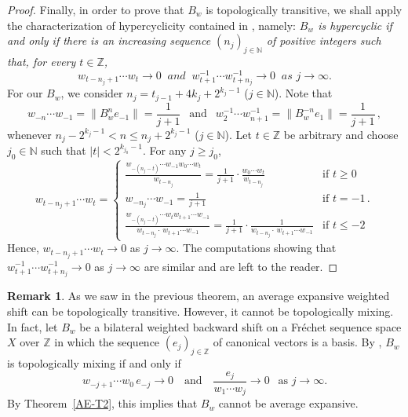\documentclass[12pt]{amsart}
\theoremstyle{theorem}
\theoremstyle{definition}
\newtheorem{remark}[theorem]{Remark}
\theoremstyle{remark} \theoremstyle{question} \theoremstyle{example}
\newcommand{\N}{\mathbb{N}}   %
\newcommand{\Z}{\mathbb{Z}}   %
\begin{document}
\begin{proof}
Finally, in order to prove that $B_w$ is topologically transitive, we shall apply the characterization of hypercyclicity contained
in \cite[Example~4.15]{KGroAPer11}, namely: {\it $B_w$ is hypercyclic if and only if there is an increasing sequence $(n_j)_{j \in \N}$
of positive integers such that, for every $t \in \Z$,}
\[
w_{t - n_j + 1} \cdots w_t \to 0 \ \textit{ and } \ w_{t+1}^{-1} \cdots w_{t+n_j}^{-1} \to 0 \ \textit{ as } j \to \infty.
\]
For our $B_w$, we consider $n_j = t_{j-1} + 4k_j + 2^{k_j - 1}$ ($j \in \N$). Note that
\[
w_{-n} \cdots w_{-1} = \|B_w^n e_{-1}\| = \frac{1}{j+1} \ \ \text{ and } \ \ w_2^{-1} \cdots w_{n+1}^{-1} = \|B_w^{-n} e_1\| = \frac{1}{j+1}\,,
\]
whenever $n_j - 2^{k_j - 1} < n \leq n_j + 2^{k_j - 1}$ ($j \in \N$).
Let $t \in \Z$ be arbitrary and choose $j_0 \in \N$ such that $|t| < 2^{k_{j_0} - 1}$.
For any $j \geq j_0$,
\[
w_{t - n_j + 1} \cdots w_t = \left\{\begin{array}{cl}
  \frac{w_{-(n_j - t)} \cdots w_{-1} w_0 \cdots w_t}{w_{t - n_j}} = \frac{1}{j+1} \cdot \frac{w_0 \cdots w_t}{w_{t - n_j}} & \text{if } t \geq 0\\
  w_{-n_j} \cdots w_{-1} = \frac{1}{j+1} & \text{if } t = -1\,.\\
  \frac{w_{-(n_j - t)} \cdots w_{t} w_{t+1} \cdots w_{-1}}{w_{t - n_j} \cdot\, w_{t+1} \cdots w_{-1}} 
    = \frac{1}{j+1} \cdot \frac{1}{w_{t - n_j} \cdot\, w_{t+1} \cdots w_{-1}}& \text{if } t \leq -2
\end{array}\right.
\]
Hence, $w_{t - n_j + 1} \cdots w_t \to 0$ as $j \to \infty$.
The computations showing that $w_{t+1}^{-1} \cdots w_{t+n_j}^{-1} \to 0$ as $j \to \infty$ are similar and are left to the reader.
\end{proof}

\begin{remark}
As we saw in the previous theorem, an average expansive weighted shift can be topologically transitive.
However, it cannot be topologically mixing. 
In fact, let $B_w$ be a bilateral weighted backward shift on a Fr\'echet sequence space $X$ over $\Z$
in which the sequence $(e_j)_{j \in \Z}$ of canonical vectors is a basis.
By \cite[Theorem~4.13]{KGroAPer11}, $B_w$ is topologically mixing if and only if
\[
w_{-j+1} \cdots w_0\, e_{-j} \to 0 \ \ \ \text{ and } \ \ \ \frac{e_j}{w_1 \cdots w_j} \to 0 \ \ \text{ as } j \to \infty.
\]
By Theorem~\ref{AE-T2}, this implies that $B_w$ cannot be average expansive.
\end{remark}

\end{document}

